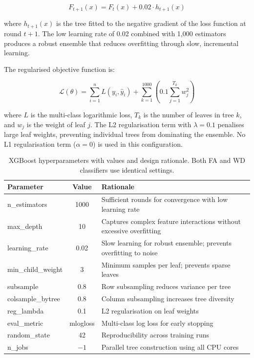\documentclass[10pt,a4paper]{article}
\begin{document}
\begin{equation}
F_{t+1}(x) = F_t(x) + 0.02 \cdot h_{t+1}(x)
\label{eq:xgb-update}
\end{equation}

where $h_{t+1}(x)$ is the tree fitted to the negative gradient of the loss function at round $t+1$. The low learning rate of 0.02 combined with 1{,}000 estimators produces a robust ensemble that reduces overfitting through slow, incremental learning.

The regularised objective function is:

\begin{equation}
\mathcal{L}(\theta) = \sum_{i=1}^{n} L(y_i, \hat{y}_i) + \sum_{k=1}^{1000} \left(0.1 \sum_{j=1}^{T_k} w_j^2\right)
\label{eq:xgb-objective}
\end{equation}

where $L$ is the multi-class logarithmic loss, $T_k$ is the number of leaves in tree $k$, and $w_j$ is the weight of leaf $j$. The L2 regularisation term with $\lambda = 0.1$ penalises large leaf weights, preventing individual trees from dominating the ensemble. No L1 regularisation term ($\alpha = 0$) is used in this configuration.

\begin{table}[H]
\centering
\caption{XGBoost hyperparameters with values and design rationale. Both FA and WD classifiers use identical settings.}
\label{tab:xgb-hyperparams}
\begin{tabular}{lcR{6cm}}
\toprule
\textbf{Parameter} & \textbf{Value} & \textbf{Rationale} \\
\midrule
n\_estimators      & 1000 & Sufficient rounds for convergence with low learning rate \\
max\_depth         & 10   & Captures complex feature interactions without excessive overfitting \\
learning\_rate     & 0.02 & Slow learning for robust ensemble; prevents overfitting to noise \\
min\_child\_weight & 3    & Minimum samples per leaf; prevents sparse leaves \\
subsample          & 0.8  & Row subsampling reduces variance per tree \\
colsample\_bytree  & 0.8  & Column subsampling increases tree diversity \\
reg\_lambda        & 0.1  & L2 regularisation on leaf weights \\
eval\_metric       & mlogloss & Multi-class log loss for early stopping \\
random\_state      & 42   & Reproducibility across training runs \\
n\_jobs            & $-1$ & Parallel tree construction using all CPU cores \\
\bottomrule
\end{tabular}
\end{table}
\end{document}
